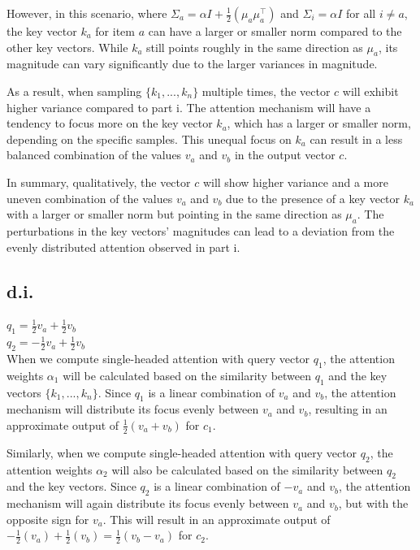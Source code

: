 \documentclass[a4paper]{article}
\begin{document}
However, in this scenario, where $\Sigma_a = \alpha I + \frac{1}{2} (\mu_a \mu_a^\top)$ and $\Sigma_i = \alpha I$ for all $i \neq a$, the key vector $k_a$ for item $a$ can have a larger or smaller norm compared to the other key vectors. While $k_a$ still points roughly in the same direction as $\mu_a$, its magnitude can vary significantly due to the larger variances in magnitude.

As a result, when sampling $\{k_1, ..., k_n\}$ multiple times, the vector $c$ will exhibit higher variance compared to part i. The attention mechanism will have a tendency to focus more on the key vector $k_a$, which has a larger or smaller norm, depending on the specific samples. This unequal focus on $k_a$ can result in a less balanced combination of the values $v_a$ and $v_b$ in the output vector $c$.

In summary, qualitatively, the vector $c$ will show higher variance and a more uneven combination of the values $v_a$ and $v_b$ due to the presence of a key vector $k_a$ with a larger or smaller norm but pointing in the same direction as $\mu_a$. The perturbations in the key vectors' magnitudes can lead to a deviation from the evenly distributed attention observed in part i.

\subsection*{d.i.}

$q_1 = \frac{1}{2} v_a + \frac{1}{2} v_b$
\\
$q_2 = -\frac{1}{2} v_a + \frac{1}{2} v_b$
\\

When we compute single-headed attention with query vector $q_1$, the attention weights $\alpha_1$ will be calculated based on the similarity between $q_1$ and the key vectors $\{k_1, ..., k_n\}$. Since $q_1$ is a linear combination of $v_a$ and $v_b$, the attention mechanism will distribute its focus evenly between $v_a$ and $v_b$, resulting in an approximate output of $\frac{1}{2} (v_a + v_b)$ for $c_1$.

Similarly, when we compute single-headed attention with query vector $q_2$, the attention weights $\alpha_2$ will also be calculated based on the similarity between $q_2$ and the key vectors. Since $q_2$ is a linear combination of $-v_a$ and $v_b$, the attention mechanism will again distribute its focus evenly between $v_a$ and $v_b$, but with the opposite sign for $v_a$. This will result in an approximate output of $-\frac{1}{2} (v_a) + \frac{1}{2} (v_b) = \frac{1}{2} (v_b - v_a)$ for $c_2$.
\end{document}
